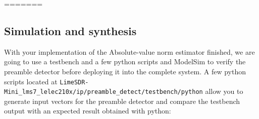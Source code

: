 \begin{enumerate}

=======
\subsection{Simulation and synthesis}
\begin{sloppypar}
With your implementation of the Absolute-value norm estimator finished, we are going to use a testbench and a few python scripts and ModelSim to verify the preamble detector before deploying it into the complete system. A few python scripts located at \texttt{LimeSDR-Mini\_lms7\_lelec210x/ip/preamble\_detect/testbench/python} allow you to generate input vectors for the preamble detector and compare the testbench output with an expected result obtained with python:


\end{sloppypar}
\end{enumerate}
